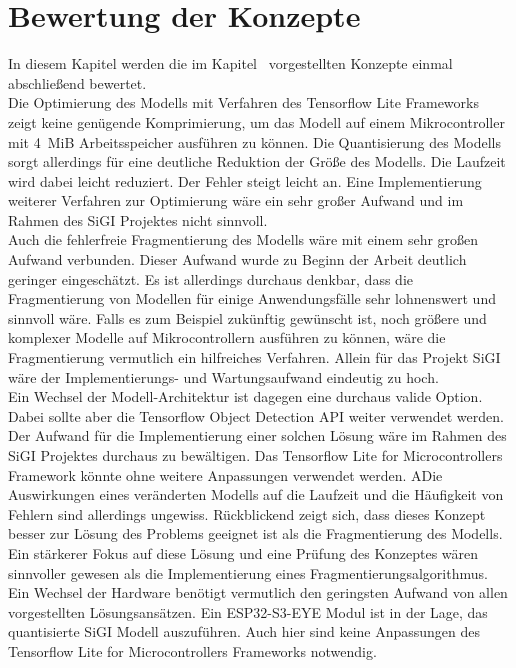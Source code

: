 \section{Bewertung der Konzepte}\label{sec:Bewertung}
    In diesem Kapitel werden die im Kapitel~ vorgestellten Konzepte einmal abschließend bewertet.\\ Die Optimierung des Modells mit Verfahren des Tensorflow Lite Frameworks zeigt keine genügende Komprimierung, um das Modell auf einem Mikrocontroller mit \SI{4}{MiB} Arbeitsspeicher ausführen zu können. Die Quantisierung des Modells sorgt allerdings für eine deutliche Reduktion der Größe des Modells. Die Laufzeit wird dabei leicht reduziert. Der Fehler steigt leicht an. Eine Implementierung weiterer Verfahren zur Optimierung wäre ein sehr großer Aufwand und im Rahmen des SiGI Projektes nicht sinnvoll.\\ Auch die fehlerfreie  Fragmentierung des Modells wäre mit einem sehr großen Aufwand verbunden. Dieser Aufwand wurde zu Beginn der Arbeit deutlich geringer eingeschätzt. Es ist allerdings durchaus denkbar, dass die Fragmentierung von Modellen für einige Anwendungsfälle sehr lohnenswert und sinnvoll wäre. Falls es zum Beispiel zukünftig gewünscht ist, noch größere und komplexer Modelle auf Mikrocontrollern ausführen zu können, wäre die Fragmentierung vermutlich ein hilfreiches Verfahren. Allein für das Projekt SiGI wäre der Implementierungs- und Wartungsaufwand eindeutig zu hoch.\\ Ein Wechsel der Modell-Architektur ist dagegen eine durchaus valide Option. Dabei sollte aber die Tensorflow Object Detection API weiter verwendet werden. Der Aufwand für die Implementierung einer solchen Lösung wäre im Rahmen des SiGI Projektes durchaus zu bewältigen. Das Tensorflow Lite for Microcontrollers Framework könnte ohne weitere Anpassungen verwendet werden. ADie Auswirkungen eines veränderten Modells auf die Laufzeit und die Häufigkeit von Fehlern sind allerdings ungewiss. Rückblickend zeigt sich, dass dieses Konzept besser zur Lösung des Problems geeignet ist als die Fragmentierung des Modells. Ein stärkerer Fokus auf diese Lösung und eine Prüfung des Konzeptes wären sinnvoller gewesen als die Implementierung eines Fragmentierungsalgorithmus.\\ Ein Wechsel der Hardware benötigt vermutlich den geringsten Aufwand von allen vorgestellten Lösungsansätzen. Ein ESP32-S3-EYE Modul ist in der Lage, das quantisierte SiGI Modell auszuführen. Auch hier sind keine Anpassungen des Tensorflow Lite for Microcontrollers Frameworks notwendig.